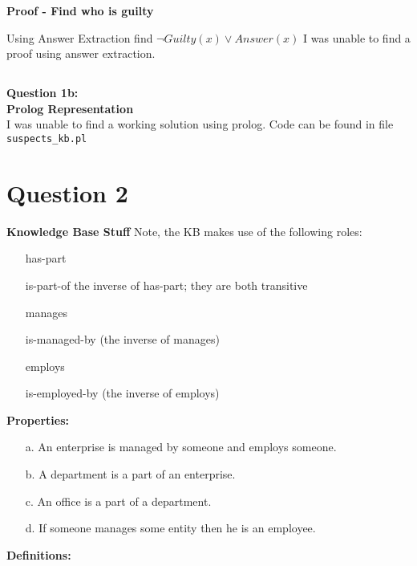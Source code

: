 \documentclass[11pt]{article}
\begin{document}
\textbf{Proof - Find who is guilty}

Using Answer Extraction find $\lnot Guilty(x) \lor Answer(x)$
I was unable to find a proof using answer extraction. 


\subsection{}
\textbf{Question 1b:} \\
\textbf{Prolog Representation} \\
I was unable to find a working solution using prolog. Code can be found in file \texttt{suspects\_kb.pl}
\section{Question 2}
\textbf{Knowledge Base Stuff} 
Note, the KB makes use of the following roles:

\begin{itemize}
    \item[] has-part
    \item[] is-part-of the inverse of has-part; they are both transitive
    \item[] manages
    \item[] is-managed-by (the inverse of manages)
    \item[] employs
    \item[] is-employed-by (the inverse of employs)
\end{itemize}

\noindent\textbf{Properties:}
\begin{itemize}
    \item[a.] An enterprise is managed by someone and employs someone.
    \item[b.] A department is a part of an enterprise.
    \item[c.] An office is a part of a department.
    \item[d.] If someone manages some entity then he is an employee.
\end{itemize} 

\noindent\textbf{Definitions:}
\end{document}
